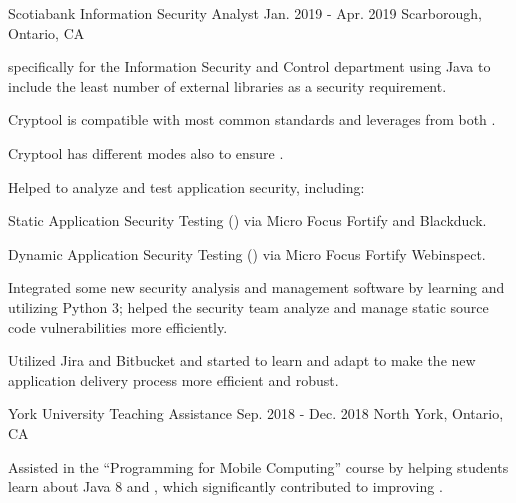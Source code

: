 \begin{cventries}
  \cventry
    {Scotiabank} %
    {Information Security Analyst} %
    {Jan. 2019 - Apr. 2019} %
    {Scarborough, Ontario, CA} %
    {
      \begin{cvitems} %
        \item { specifically for the Information Security and Control department using Java  to include the least number of external libraries as a security requirement.}
          \begin{cvsubitems}
            \item {Cryptool is compatible with most common  standards and leverages from both .}
            \item {Cryptool has different modes also to ensure .}
          \end{cvsubitems}
        \item {Helped to analyze and test application security, including:}
          \begin{cvsubitems}
            \item {Static Application Security Testing () via Micro Focus Fortify and Blackduck.}
            \item {Dynamic Application Security Testing () via Micro Focus Fortify Webinspect.}
          \end{cvsubitems}
        \item {Integrated some new security analysis and management software by learning and utilizing Python 3; helped the security team analyze and manage static source code vulnerabilities more efficiently.}
          \begin{cvsubitems}
            \item {Utilized Jira and Bitbucket and started to learn and adapt  to make the new application delivery process more efficient and robust.}
          \end{cvsubitems}
      \end{cvitems}
    }

  \cventry
    {York University} %
    {Teaching Assistance} %
    {Sep. 2018 - Dec. 2018} %
    {North York, Ontario, CA} %
    {
      \begin{cvitems} %
        \item {Assisted in the “Programming for Mobile Computing” course by helping students learn about Java 8 and , which significantly contributed to improving .}
      \end{cvitems}
    }


\end{cventries}
